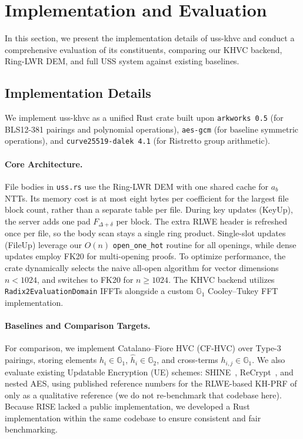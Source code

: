 \section{Implementation and Evaluation}
\label{sec:impl_eval}

In this section, we present the implementation details of \textsf{uss-khvc} and conduct a comprehensive evaluation of its constituents, comparing our KHVC backend, Ring-LWR DEM, and full USS system against existing baselines.

\subsection{Implementation Details}
\label{sec:impl}

We implement \textsf{uss-khvc} as a unified Rust crate built upon \texttt{arkworks 0.5} (for BLS12-381 pairings and polynomial operations), \texttt{aes-gcm} (for baseline symmetric operations), and \texttt{curve25519-dalek 4.1} (for Ristretto group arithmetic).

\paragraph{Core Architecture.}
File bodies in \texttt{uss.rs} use the Ring-LWR DEM with one shared cache for $a_b$ NTTs. Its memory cost is at most eight bytes per coefficient for the largest file block count, rather than a separate table per file. During key updates (\textsf{KeyUp}), the server adds one pad $F_{\Delta+\delta}$ per block. The extra RLWE header is refreshed once per file, so the body scan stays a single ring product. Single-slot updates (\textsf{FileUp}) leverage our $O(n)$ \texttt{open\_one\_hot} routine for all openings, while dense updates employ FK20 for multi-opening proofs. To optimize performance, the crate dynamically selects the naive all-open algorithm for vector dimensions $n < 1024$, and switches to FK20 for $n \ge 1024$. The KHVC backend utilizes \texttt{Radix2EvaluationDomain} IFFTs alongside a custom $\mathbb{G}_1$ Cooley--Tukey FFT implementation.

\paragraph{Baselines and Comparison Targets.}
For comparison, we implement Catalano--Fiore HVC (CF-HVC) over Type-3 pairings, storing elements $h_i \in \mathbb{G}_1$, $\hat{h}_i \in \mathbb{G}_2$, and cross-terms $h_{i,j} \in \mathbb{G}_1$. We also evaluate existing Updatable Encryption (UE) schemes: SHINE~\cite{SHINEcode}, ReCrypt~\cite{ReCryptcode}, and nested AES, using published reference numbers for the RLWE-based KH-PRF of~\cite{BDGJ20} only as a qualitative reference (we do not re-benchmark that codebase here). Because RISE lacked a public implementation, we developed a Rust implementation within the same codebase to ensure consistent and fair benchmarking.

